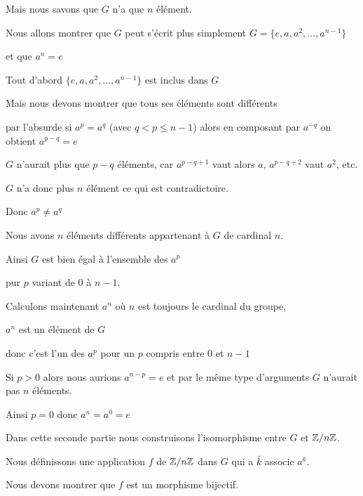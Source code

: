 \change

Mais nous savons que $G$ n'a que $n$ élément.

Nous allons montrer que $G$ peut s'écrit plus simplement
 $G = \big\{e, a, a^2, \ldots, a^{n-1}\big\}$

et que $a^n = e$


\change

Tout d'abord
 $\big\{e, a, a^2, \ldots, a^{n-1}\big\}$ est inclus dans $G$

\change

Mais nous devons montrer que tous ses éléments sont différents 

par l'absurde si $a^p=a^q$ (avec $q < p \le n-1$) alors 
en composant par $a^{-q}$ on obtient $a^{p-q}=e$ 


$G$ n'aurait plus que $p-q$ éléments, car 
$a^{p-q+1}$ vaut alors $a$, $a^{p-q+2}$ vaut $a^2$, etc.



$G$ n'a donc plus $n$ élément ce qui est contradictoire.

Donc $a^p \neq a^q$


\change  

Nous avons $n$ éléments différents appartenant à $G$ de cardinal $n$.

Ainsi $G$ est bien égal à l'ensemble des $a^p$

pur $p$ variant de $0$ à $n-1$.


\change

Calculons maintenant $a^n$ où $n$ est toujours le cardinal du groupe,

$a^n$ est un élément de $G$ 

donc c'est l'un des $a^p$ pour un $p$ compris entre $0$ et $n-1$

Si $p>0$ alors nous aurions $a^{n-p}=e$ et par le même type d'arguments 
$G$ n'aurait pas $n$ éléments.

\change

Ainsi $p=0$ donc $a^n=a^0=e$



\diapo

Dans cette seconde partie 
nous construisons l'isomorphisme entre $G$ et $\mathbb{Z}/n\mathbb{Z}$.

\change

Nous définissons une application $f$ de $\mathbb{Z}/n\mathbb{Z}$ dans $G$
qui a $\bar k$  associe  $a^k$.

Nous devons montrer que $f$ est un morphisme bijectif.

